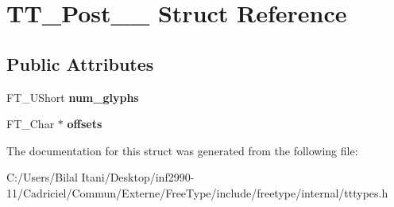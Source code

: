 \hypertarget{struct_t_t___post__25__}{}\section{T\+T\+\_\+\+Post\+\_\+\_\+ Struct Reference}
\label{struct_t_t___post__25__}
\subsection*{Public Attributes}
\begin{DoxyCompactItemize}
\item 
F\+T\+\_\+\+U\+Short {\bfseries num\+\_\+glyphs}\hypertarget{struct_t_t___post__25___aae397ce6206c910ecc13f8b46bace595}{}\label{struct_t_t___post__25___aae397ce6206c910ecc13f8b46bace595}

\item 
F\+T\+\_\+\+Char $\ast$ {\bfseries offsets}\hypertarget{struct_t_t___post__25___a499ec966b258c8454e9ea8f9455028b6}{}\label{struct_t_t___post__25___a499ec966b258c8454e9ea8f9455028b6}

\end{DoxyCompactItemize}


The documentation for this struct was generated from the following file\+:\begin{DoxyCompactItemize}
\item 
C\+:/\+Users/\+Bilal Itani/\+Desktop/inf2990-\/11/\+Cadriciel/\+Commun/\+Externe/\+Free\+Type/include/freetype/internal/tttypes.\+h\end{DoxyCompactItemize}
